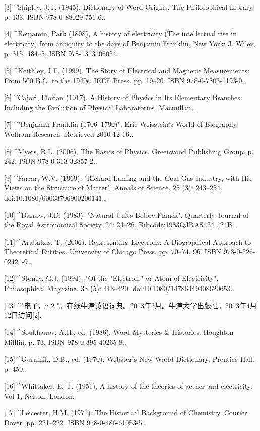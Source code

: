 [3]
^Shipley, J.T. (1945). Dictionary of Word Origins. The Philosophical Library. p. 133. ISBN 978-0-88029-751-6..

[4]
^Benjamin, Park (1898), A history of electricity (The intellectual rise in electricity) from antiquity to the days of Benjamin Franklin, New York: J. Wiley, p. 315, 484–5, ISBN 978-1313106054.

[5]
^Keithley, J.F. (1999). The Story of Electrical and Magnetic Measurements: From 500 B.C. to the 1940s. IEEE Press. pp. 19–20. ISBN 978-0-7803-1193-0..

[6]
^Cajori, Florian (1917). A History of Physics in Its Elementary Branches: Including the Evolution of Physical Laboratories. Macmillan..

[7]
^"Benjamin Franklin (1706–1790)". Eric Weisstein's World of Biography. Wolfram Research. Retrieved 2010-12-16..

[8]
^Myers, R.L. (2006). The Basics of Physics. Greenwood Publishing Group. p. 242. ISBN 978-0-313-32857-2..

[9]
^Farrar, W.V. (1969). "Richard Laming and the Coal-Gas Industry, with His Views on the Structure of Matter". Annals of Science. 25 (3): 243–254. doi:10.1080/00033796900200141..

[10]
^Barrow, J.D. (1983). "Natural Units Before Planck". Quarterly Journal of the Royal Astronomical Society. 24: 24–26. Bibcode:1983QJRAS..24...24B..

[11]
^Arabatzis, T. (2006). Representing Electrons: A Biographical Approach to Theoretical Entities. University of Chicago Press. pp. 70–74, 96. ISBN 978-0-226-02421-9..

[12]
^Stoney, G.J. (1894). "Of the "Electron," or Atom of Electricity". Philosophical Magazine. 38 (5): 418–420. doi:10.1080/14786449408620653..

[13]
^"电子，n.2 "。在线牛津英语词典。2013年3月。牛津大学出版社。2013年4月12日访问[2].

[14]
^Soukhanov, A.H., ed. (1986). Word Mysteries & Histories. Houghton Mifflin. p. 73. ISBN 978-0-395-40265-8..

[15]
^Guralnik, D.B., ed. (1970). Webster's New World Dictionary. Prentice Hall. p. 450..

[16]
^Whittaker, E. T. (1951), A history of the theories of aether and electricity. Vol 1, Nelson, London.

[17]
^Leicester, H.M. (1971). The Historical Background of Chemistry. Courier Dover. pp. 221–222. ISBN 978-0-486-61053-5..

